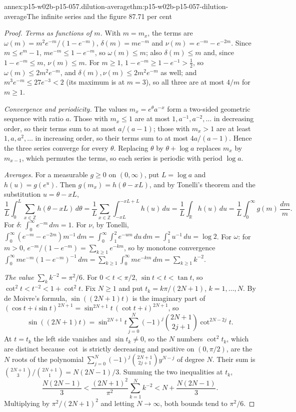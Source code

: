 \begin{annexitem}{annex:p15-w02b-p15-057.dilution-average}{thm:p15-w02b-p15-057-dilution-average}{The infinite series and the figure 87.71 per cent}
\begin{proof}
\emph{Terms as functions of \(m\).} With \(m=m_x\), the terms are
\(\omega(m)=m^2e^{-m}/(1-e^{-m})\), \(\delta(m)=me^{-m}\) and
\(\nu(m)=e^{-m}-e^{-2m}\). Since \(m\leq e^m-1\), \(me^{-m}\leq1-e^{-m}\),
so \(\omega(m)\leq m\); also \(\delta(m)\leq m\) and, since
\(1-e^{-m}\leq m\), \(\nu(m)\leq m\). For \(m\geq1\),
\(1-e^{-m}\geq1-e^{-1}>\tfrac12\), so \(\omega(m)\leq2m^2e^{-m}\), and
\(\delta(m),\nu(m)\leq2m^2e^{-m}\) as well; and \(m^3e^{-m}\leq27e^{-3}<2\)
(its maximum is at \(m=3\)), so all three are at most \(4/m\) for
\(m\geq1\).

\emph{Convergence and periodicity.} The values \(m_x=e^\theta a^{-x}\) form
a two-sided geometric sequence with ratio \(a\). Those with \(m_x\leq1\)
are at most \(1,a^{-1},a^{-2},\ldots\) in decreasing order, so their terms
sum to at most \(a/(a-1)\); those with \(m_x>1\) are at least
\(1,a,a^2,\ldots\) in increasing order, so their terms sum to at most
\(4a/(a-1)\). Hence the three series converge for every \(\theta\).
Replacing \(\theta\) by \(\theta+\log a\) replaces \(m_x\) by \(m_{x-1}\),
which permutes the terms, so each series is periodic with period
\(\log a\).

\emph{Averages.} For a measurable \(g\geq0\) on \((0,\infty)\), put
\(L=\log a\) and \(h(u)=g(e^u)\). Then \(g(m_x)=h(\theta-xL)\), and by
Tonelli's theorem and the substitution \(u=\theta-xL\),
\[
 \frac1L\int_0^L\sum_{x\in\mathbb Z}h(\theta-xL)\,d\theta
 =\frac1L\sum_{x\in\mathbb Z}\int_{-xL}^{-xL+L}h(u)\,du
 =\frac1L\int_{\mathbb R}h(u)\,du=\frac1L\int_0^\infty g(m)\,\frac{dm}m .
\]
For \(\delta\): \(\int_0^\infty e^{-m}\,dm=1\). For \(\nu\), by Tonelli,
\(\int_0^\infty(e^{-m}-e^{-2m})m^{-1}\,dm
=\int_0^\infty\int_1^2e^{-um}\,du\,dm=\int_1^2u^{-1}\,du=\log2\). For
\(\omega\): for \(m>0\), \(e^{-m}/(1-e^{-m})=\sum_{k\geq1}e^{-km}\), so by
monotone convergence
\(\int_0^\infty me^{-m}(1-e^{-m})^{-1}\,dm=\sum_{k\geq1}\int_0^\infty
me^{-km}\,dm=\sum_{k\geq1}k^{-2}\).

\emph{The value \(\sum_kk^{-2}=\pi^2/6\).} For \(0<t<\pi/2\),
\(\sin t<t<\tan t\), so \(\cot^2t<t^{-2}<1+\cot^2t\). Fix \(N\geq1\) and put
\(t_k=k\pi/(2N+1)\), \(k=1,\ldots,N\). By de Moivre's formula,
\(\sin((2N+1)t)\) is the imaginary part of
\((\cos t+i\sin t)^{2N+1}=\sin^{2N+1}t\,(\cot t+i)^{2N+1}\), so
\[
 \sin((2N+1)t)=\sin^{2N+1}t\sum_{j=0}^{N}(-1)^j\binom{2N+1}{2j+1}
 \cot^{2N-2j}t .
\]
At \(t=t_k\) the left side vanishes and \(\sin t_k\neq0\), so the \(N\)
numbers \(\cot^2t_k\), which are distinct because \(\cot\) is strictly
decreasing and positive on \((0,\pi/2)\), are the \(N\) roots of the
polynomial \(\sum_{j=0}^N(-1)^j\binom{2N+1}{2j+1}y^{N-j}\) of degree \(N\).
Their sum is
\(\binom{2N+1}3/\binom{2N+1}1=N(2N-1)/3\). Summing the two inequalities at
\(t_k\),
\[
 \frac{N(2N-1)}3<\frac{(2N+1)^2}{\pi^2}\sum_{k=1}^Nk^{-2}
 <N+\frac{N(2N-1)}3 .
\]
Multiplying by \(\pi^2/(2N+1)^2\) and letting \(N\to\infty\), both bounds
tend to \(\pi^2/6\).


\end{proof}
\end{annexitem}
